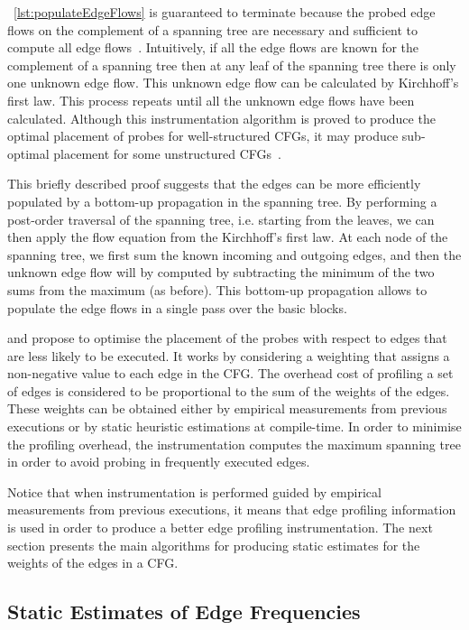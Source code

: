 \lstlistingname~\ref{lst:populateEdgeFlows} is guaranteed to terminate because the probed edge flows on the complement of a spanning tree are necessary and sufficient to compute all edge flows~\citep{nahapetian73,forman81}.
Intuitively, if all the edge flows are known for the complement of a spanning tree then at any leaf of the spanning tree there is only one unknown edge flow.
This unknown edge flow can be calculated by Kirchhoff's first law.
This process repeats until all the unknown edge flows have been calculated.
Although this instrumentation algorithm is proved to produce the optimal placement of probes for well-structured CFGs, it may produce sub-optimal placement for some unstructured CFGs~\citep{ball94}.

This briefly described proof suggests that the edges can be more efficiently populated by a bottom-up propagation in the spanning tree.
By performing a post-order traversal of the spanning tree, i.e. starting from the leaves, we can then apply the flow equation from the Kirchhoff's first law.
At each node of the spanning tree, we first sum the known incoming and outgoing edges, and then the unknown edge flow will by computed by subtracting the minimum of the two sums from the maximum (as before).
This bottom-up propagation allows to populate the edge flows in a single pass over the basic blocks.

\cite{forman81} and \cite{ball94} propose to optimise the placement of the probes with respect to edges that are less likely to be executed.
It works by considering a weighting that assigns a non-negative value to each edge in the CFG.
The overhead cost of profiling a set of edges is considered to be proportional to the sum of the weights of the edges.
These weights can be obtained either by empirical measurements from previous executions or by static heuristic estimations at compile-time.
In order to minimise the profiling overhead, the instrumentation computes the maximum spanning tree in order to avoid probing in frequently executed edges.

Notice that when instrumentation is performed guided by empirical measurements from previous executions, it means that edge profiling information is used in order to produce a better edge profiling instrumentation.
The next section presents the main algorithms for producing static estimates for the weights of the edges in a CFG.

\subsection{Static Estimates of Edge Frequencies}

